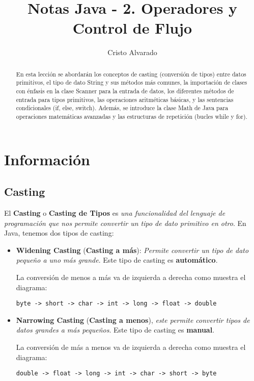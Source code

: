 \documentclass[12pt]{article}
\theoremstyle{largebreak}
\begin{document}
    \setlength{\parskip}{5pt}
    \setlength{\parindent}{12pt}
    \title{Notas Java - 2. Operadores y Control de Flujo}
    \author{Cristo Alvarado}
    \maketitle

    \begin{abstract}
        En esta lección se abordarán los conceptos de casting (conversión de tipos) entre datos primitivos, el tipo de dato String y sus métodos más comunes, la importación de clases con énfasis en la clase Scanner para la entrada de datos, los diferentes métodos de entrada para tipos primitivos, las operaciones aritméticas básicas, y las sentencias condicionales (if, else, switch). Además, se introduce la clase Math de Java para operaciones matemáticas avanzadas y las estructuras de repetición (bucles while y for).
    \end{abstract}
    
    \tableofcontents

    \lstlistoflistings

    \section{Información}

    \subsection{Casting}

    \begin{mydef}
        El \textbf{Casting} o \textbf{Casting de Tipos} es \textit{una funcionalidad del lenguaje de programación que nos permite convertir un tipo de dato primitivo en otro}. En Java, tenemos dos tipos de casting:
        \begin{itemize}
            \item \textbf{Widening Casting} (\textbf{Casting a más}): \textit{Permite convertir un tipo de dato pequeño a uno más grande}. Este tipo de casting es \textbf{automático}.
            
            La conversión de menos a más va de izquierda a derecha como muestra el diagrama:
            \begin{center}
                \texttt{byte -> short -> char -> int -> long -> float -> double}
            \end{center}
            \item \textbf{Narrowing Casting} (\textbf{Casting a menos}), \textit{este permite convertir tipos de datos grandes a más pequeños}. Este tipo de casting es \textbf{manual}.
            
            La conversión de más a menos va de izquierda a derecha como muestra el diagrama:
            \begin{center}
                \texttt{double -> float -> long -> int -> char -> short -> byte}
            \end{center}
        \end{itemize}
    \end{mydef}
\end{document}
